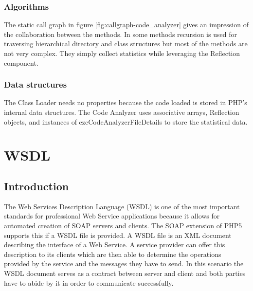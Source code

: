 \documentclass[10pt,final,a4paper,oneside]{article}
\begin{document}
%
%
%
%
%
%
%
%
% 
% 
% 
% 



\subsubsection{Algorithms}

The static call graph in figure \ref{fig:callgraph-code_analyzer}
gives an impression of the collaboration between the methods.
In some methods recursion is used for traversing hierarchical 
directory and class structures but most of the methods
are not very complex. They simply collect statistics while
leveraging the Reflection component.

\subsubsection{Data structures}
The Class Loader needs no properties
because the code loaded is stored
in PHP's internal data structures.
The Code Analyzer uses associative arrays, Reflection objects, 
and instances of ezcCodeAnalyzerFileDetails
to store the statistical data.




\section{WSDL}\label{sec:WSDL}
\subsection{Introduction}
The Web Services Description Language (WSDL) \cite{WSDL}
is one of the most important standards
for professional Web Service applications
because it allows for automated creation
of SOAP servers and clients.
The SOAP extension of PHP5 supports this
if a WSDL file is provided.
A WSDL file is an XML document
describing the interface of a Web Service.
A service provider can offer this description
to its clients which are then able
to determine the operations provided by the service
and the messages they have to send.
In this scenario the WSDL document
serves as a contract between server and client
and both parties have to abide by it
in order to communicate successfully.
\end{document}

